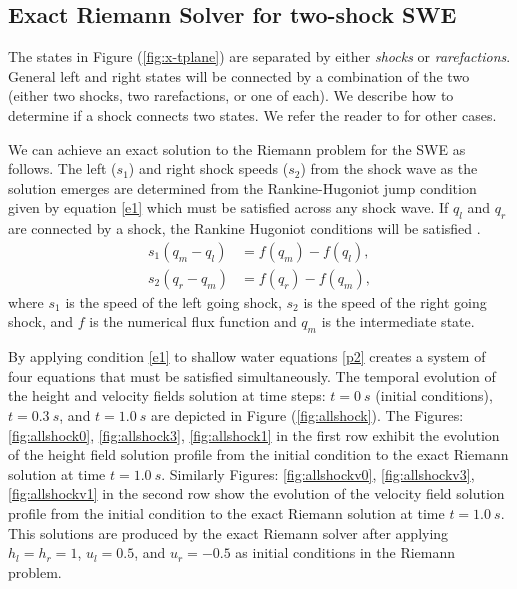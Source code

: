 \documentclass[9pt,a4paper]{article}
\newcommand{\Fig}[1]{Figure (\ref{fig:#1})}
\begin{document}
	
	
	\subsection{Exact Riemann Solver for two-shock SWE}
	The states in \Fig{x-tplane} are separated by either {\em shocks} or {\em rarefactions}. General left and right states will be connected by a combination of the two (either two shocks, two rarefactions, or one of each).  We describe how to determine if a shock connects two states.  We refer the reader to   \citet{leveque2002finite} for other cases. 
	
	We can achieve an exact solution to the Riemann problem for the SWE as follows. 
	The left ($s_1$) and right shock speeds ($s_2$)  from the shock wave as the solution emerges are determined from the Rankine-Hugoniot jump condition given by equation \eqref{e1}  which must be satisfied across any shock wave.  If $q_l$ and $q_r$ are connected by a shock, the Rankine Hugoniot conditions will be satisfied \citep{leveque2002finite,toro2001shock}.
	\begin{equation}
		\begin{aligned}
			s_1(q_{m} - q_{l}) & = f(q_{m}) - f(q_{l}), \\
			s_2(q_{r} - q_{m}) & = f(q_{r}) - f(q_{m}),
		\end{aligned}
		\label{e1}
	\end{equation}
	where $s_1$ is the speed of the left going shock,  $s_2$ is the speed of the right going shock, and $f$ is the numerical flux function and $q_m$ is the intermediate state. 
	
	By applying condition  \eqref{e1} to shallow water equations \eqref{p2}  creates a system of four equations that must be satisfied simultaneously. The temporal evolution of the height and velocity fields solution at time steps: $t=0~s$ (initial conditions), $t = 0.3~s$, and $t = 1.0~s$ are  depicted in \Fig{allshock}. The Figures: \ref{fig:allshock0}, \ref{fig:allshock3}, \ref{fig:allshock1} in the first row exhibit the evolution of the height field solution profile from the initial condition to the exact Riemann solution at time $t = 1.0~s$. Similarly Figures: \ref{fig:allshockv0}, \ref{fig:allshockv3}, \ref{fig:allshockv1} in the second row show the evolution of the velocity field solution profile from the initial condition to the exact Riemann solution at time $t = 1.0~s$. This solutions are produced by the exact Riemann solver after applying $h_l = h_r = 1$, $u_l  =  0.5$, and $u_r = -0.5$ as initial conditions in  the Riemann problem.
	
\end{document}
